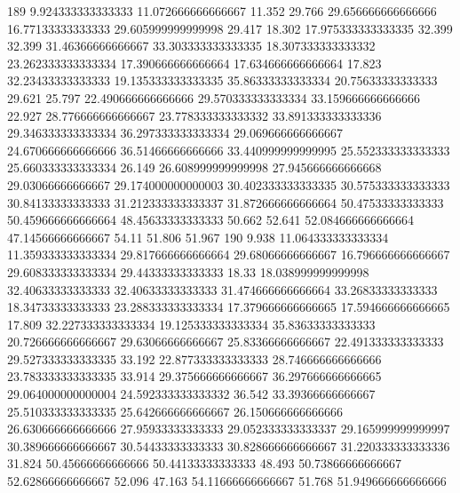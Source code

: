 189 9.924333333333333 11.072666666666667 11.352 29.766 29.656666666666666 16.77133333333333 29.605999999999998 29.417 18.302 17.975333333333335 32.399 32.399 31.46366666666667 33.303333333333335 18.307333333333332 23.262333333333334 17.390666666666664 17.634666666666664 17.823 32.23433333333333 19.135333333333335 35.86333333333334 20.75633333333333 29.621 25.797 22.490666666666666 29.570333333333334 33.159666666666666 22.927 28.776666666666667 23.778333333333332 33.891333333333336 29.346333333333334 36.297333333333334 29.069666666666667 24.670666666666666 36.51466666666666 33.440999999999995 25.552333333333333 25.660333333333334 26.149 26.608999999999998 27.945666666666668 29.03066666666667 29.174000000000003 30.402333333333335 30.575333333333333 30.84133333333333 31.212333333333337 31.872666666666664 50.47533333333333 50.459666666666664 48.45633333333333 50.662 52.641 52.084666666666664 47.14566666666667 54.11 51.806 51.967
190 9.938 11.064333333333334 11.359333333333334 29.817666666666664 29.68066666666667 16.796666666666667 29.608333333333334 29.44333333333333 18.33 18.038999999999998 32.40633333333333 32.40633333333333 31.474666666666664 33.26833333333333 18.34733333333333 23.288333333333334 17.379666666666665 17.594666666666665 17.809 32.227333333333334 19.125333333333334 35.83633333333333 20.726666666666667 29.63066666666667 25.83366666666667 22.491333333333333 29.527333333333335 33.192 22.877333333333333 28.746666666666666 23.783333333333335 33.914 29.375666666666667 36.297666666666665 29.064000000000004 24.592333333333332 36.542 33.39366666666667 25.510333333333335 25.642666666666667 26.150666666666666 26.630666666666666 27.95933333333333 29.052333333333337 29.165999999999997 30.389666666666667 30.54433333333333 30.828666666666667 31.220333333333336 31.824 50.45666666666666 50.44133333333333 48.493 50.73866666666667 52.62866666666667 52.096 47.163 54.11666666666667 51.768 51.949666666666666
